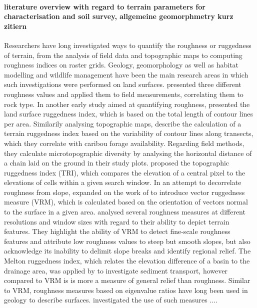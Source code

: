 \documentclass[preprint,12pt,authoryear]{elsarticle}
\begin{document}
\paragraph{literature overview with regard to terrain parameters for characterisation and soil survey, allgemeine geomorphmetry kurz zitiern}
Researchers have long investigated ways to quantify the roughness or ruggedness of terrain, from the analysis of field data and topographic maps to computing roughness indices on raster grids. Geology, geomorphology as well as habitat modelling and wildlife management have been the main research areas in which such investigations were performed on land surfaces.  \cite{Hobson1972} presented three different roughness values and applied them to field measurements, correlating them to rock type. In another early study aimed at quantifying roughness, \cite{Beasom1983} presented the land surface ruggedness index, which is based on the total length of contour lines per area. Similarily analysing topographic maps, \cite{Nellemann1994} describe the calculation of a terrain ruggedness index based on the variability of contour lines along transects, which they correlate with caribou forage availability. Regarding field methods, they calculate microtopographic diversity by analysing the horizontal distance of a chain laid on the ground in their study plots. \cite{Riley1999} proposed the topographic ruggedness index (TRI), which compares the elevation of a central pixel to the elevations of cells within a given search window. In an attempt to decorrelate roughness from slope, \cite{Sappington2007} expanded on the work of \cite{Hobson1972} to introduce vector ruggedness measure (VRM), which is calculated based on the orientation of vectors normal to the surface in a given area. \citep{Grohmann2010} analysed several roughness measures at different resolutions and window sizes with regard to their ability to depict terrain features. They highlight the ability of VRM to detect fine-scale roughness features and attribute low roughness values to steep but smooth slopes, but also acknowledge its inability to delimit slope breaks and identify regional relief. The Melton ruggedness index, which relates  the elevation difference of a basin to the drainage area, was applied by \cite{Marchi2005} to investigate sediment transport, however compared to VRM is is more a measure of general relief than roughness. Similar to VRM, roughness measures based on eigenvalue ratios have long been used in geology to describe surfaces. \cite{Coblentz2014} investigated the use of such measures  ....
\end{document}
